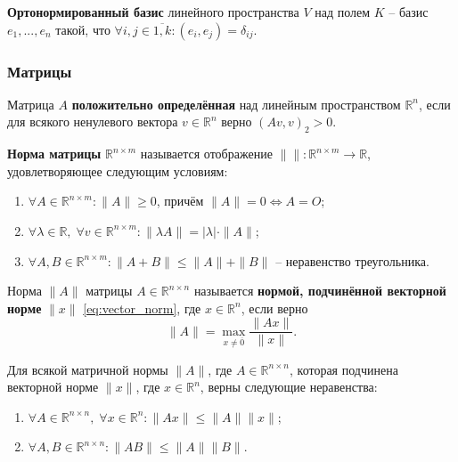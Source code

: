 \documentclass{article}
\begin{document}
\begin{define}
	\textbf{Ортонормированный базис} линейного пространства $V$ над полем
	$K$ -- базис $e_1,...,e_n$ такой, что
	$\forall i,j\in\overline{1,k}: (e_i,e_j)=\delta_{ij}$.
\end{define}

\subsubsection{Матрицы}
\begin{define}
	Матрица $A$ \textbf{положительно определённая} над линейным
	пространством $\mathbb R^n$, если для всякого ненулевого вектора
	$v\in \mathbb R^n$ верно $(Av, v)_2>0$.
\end{define}

\begin{define}
	\textbf{Норма матрицы} $\mathbb R^{n\times m}$
	называется отображение $\|\|: \mathbb R^{n\times m}\rightarrow
	\mathbb R$, удовлетворяющее следующим условиям:
	\begin{enumerate}[nosep]
		\item $\forall A\in\mathbb R^{n\times m}: \|A\|\ge 0$, причём
			$\|A\|=0\Leftrightarrow A=O$;
		\item $\forall \lambda\in \mathbb R,\;\forall v\in
			\mathbb R^{n\times m}:
			\|\lambda A\|=|\lambda|\cdot\|A\|$;
		\item $\forall A,B\in\mathbb R^{n\times m}: \|A+B\|\le\|A\|+\|B\|$ --
			неравенство треугольника.
	\end{enumerate}
\end{define}

\begin{define}
	Норма $\|A\|$ матрицы $A\in \mathbb R^{n\times n}$ называется
	\textbf{нормой, подчинённой векторной норме} $\|x\|$
	\eqref{eq:vector_norm}, где $x\in \mathbb R^n$, если верно
	\[\|A\|=\max_{x\ne \overline{0}}\frac{\|Ax\|}{\|x\|}.\]
\end{define}

\begin{lemma}\label{eq:subordinate_norm_properties}
	Для всякой матричной нормы $\|A\|$, где $A\in\mathbb R^{n\times n}$,
	которая подчинена векторной норме $\|x\|$, где $x\in\mathbb R^n$, верны
	следующие неравенства:
	\begin{enumerate}[nosep]
		\item $\forall A\in\mathbb R^{n\times n},\;\forall x\in\mathbb
			R^n: \|Ax\|\le\|A\|\|x\|$;
		\item $\forall A,B\in\mathbb R^{n\times n}:
			\|AB\|\le\|A\|\|B\|$.
	\end{enumerate}
\end{lemma}
\end{document}
